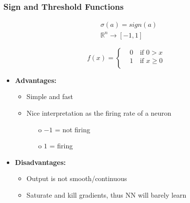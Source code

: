 \documentclass[12pt]{report}
\theoremstyle{plain}
\begin{document}
\begin{flushleft}
\subsubsection{Sign and Threshold Functions}
\begin{figure}[!h]
	\centering
	\begin{minipage}{0.4\textwidth}
		\[ \begin{aligned}&\sigma(a)=sign(a)\\&\mathds{R}^n\to[-1,1]\end{aligned} \]
	\end{minipage}
	\begin{minipage}{0.4\textwidth}
	\[ f(x)=\left\{\begin{aligned}&0 \quad\text{if } 0>x\\&1 \quad\text{if } x\geq 0\\ \end{aligned}\right. \]
	\end{minipage}
\end{figure}
\begin{itemize}
	\item \textbf{Advantages:}
	\begin{itemize}
		\item Simple and fast
		\item Nice interpretation as the firing rate of a neuron 
		\begin{itemize}
			\item[o] $-1$ = not firing
			\item[o] $1$ = firing
		\end{itemize}
	\end{itemize}
	\item \textbf{Disadvantages:}
	\begin{itemize}
		\item Output is not smooth/continuous
		\item Saturate and kill gradients, thus NN will barely learn
	\end{itemize}
\end{itemize}
		

\end{flushleft}
\end{document}
